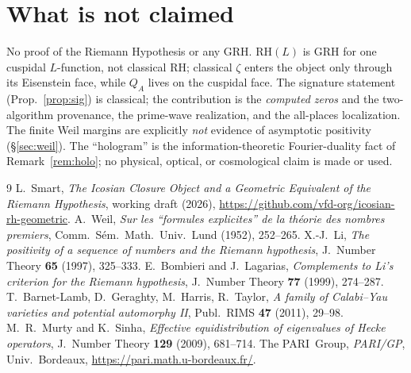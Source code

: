 \documentclass[11pt]{article}
\theoremstyle{remark}
\newcommand{\RH}{\mathrm{RH}}
\begin{document}
\section{What is not claimed}\label{sec:not}

No proof of the Riemann Hypothesis or any GRH. $\RH(L)$ is GRH for one cuspidal
$L$-function, not classical $\RH$; classical $\zeta$ enters the object only through its
Eisenstein face, while $Q_A$ lives on the cuspidal face. The signature statement
(Prop.~\ref{prop:sig}) is classical; the contribution is the \emph{computed zeros} and the
two-algorithm provenance, the prime-wave realization, and the all-places localization. The
finite Weil margins are explicitly \emph{not} evidence of asymptotic positivity
(\S\ref{sec:weil}). The ``hologram'' is the information-theoretic Fourier-duality fact of
Remark~\ref{rem:holo}; no physical, optical, or cosmological claim is made or used.

\begin{thebibliography}{9}\small
{} L.~Smart, \emph{The Icosian Closure Object and a Geometric Equivalent of
the Riemann Hypothesis}, working draft (2026),
\url{https://github.com/vfd-org/icosian-rh-geometric}.
 A.~Weil, \emph{Sur les ``formules explicites'' de la th\'eorie des nombres
premiers}, Comm.\ S\'em.\ Math.\ Univ.\ Lund (1952), 252--265.
 X.-J.~Li, \emph{The positivity of a sequence of numbers and the Riemann
hypothesis}, J.~Number Theory \textbf{65} (1997), 325--333.
 E.~Bombieri and J.~Lagarias, \emph{Complements to Li's criterion for the
Riemann hypothesis}, J.~Number Theory \textbf{77} (1999), 274--287.
 T.~Barnet-Lamb, D.~Geraghty, M.~Harris, R.~Taylor, \emph{A family of
Calabi--Yau varieties and potential automorphy II}, Publ.\ RIMS \textbf{47} (2011), 29--98.
 M.~R.~Murty and K.~Sinha, \emph{Effective equidistribution of
eigenvalues of Hecke operators}, J.~Number Theory \textbf{129} (2009), 681--714.
 The PARI~Group, \emph{PARI/GP}, Univ.\ Bordeaux,
\url{https://pari.math.u-bordeaux.fr/}.
\end{thebibliography}
\end{document}
